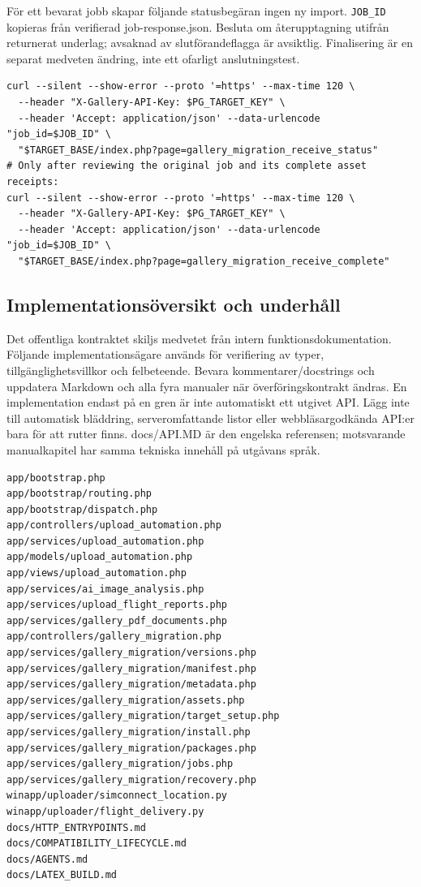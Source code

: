 \documentclass[11pt,a4paper]{article}
\newcommand{\codeword}[1]{\nolinkurl{#1}}
\begin{document}
För ett bevarat jobb skapar följande statusbegäran ingen ny import. \codeword{JOB_ID}
kopieras från verifierad job-response.json. Besluta om återupptagning utifrån returnerat
underlag; avsaknad av slutförandeflagga är avsiktlig. Finalisering är en separat medveten
ändring, inte ett ofarligt anslutningstest.

\begin{lstlisting}[language={}]
curl --silent --show-error --proto '=https' --max-time 120 \
  --header "X-Gallery-API-Key: $PG_TARGET_KEY" \
  --header 'Accept: application/json' --data-urlencode "job_id=$JOB_ID" \
  "$TARGET_BASE/index.php?page=gallery_migration_receive_status"
# Only after reviewing the original job and its complete asset receipts:
curl --silent --show-error --proto '=https' --max-time 120 \
  --header "X-Gallery-API-Key: $PG_TARGET_KEY" \
  --header 'Accept: application/json' --data-urlencode "job_id=$JOB_ID" \
  "$TARGET_BASE/index.php?page=gallery_migration_receive_complete"
\end{lstlisting}

\subsection{\texorpdfstring{Implementationsöversikt och underhåll}{Implementationsöversikt och underhåll}}

\label{api352:source-map}

Det offentliga kontraktet skiljs medvetet från intern funktionsdokumentation. Följande
implementationsägare används för verifiering av typer, tillgänglighetsvillkor och
felbeteende. Bevara kommentarer/docstrings och uppdatera Markdown och alla fyra manualer när
överföringskontrakt ändras. En implementation endast på en gren är inte automatiskt ett
utgivet API. Lägg inte till automatisk bläddring, serveromfattande listor eller
webbläsargodkända API:er bara för att rutter finns. docs/API.MD är den engelska referensen;
motsvarande manualkapitel har samma tekniska innehåll på utgåvans språk.

\begin{lstlisting}[language={}]
app/bootstrap.php
app/bootstrap/routing.php
app/bootstrap/dispatch.php
app/controllers/upload_automation.php
app/services/upload_automation.php
app/models/upload_automation.php
app/views/upload_automation.php
app/services/ai_image_analysis.php
app/services/upload_flight_reports.php
app/services/gallery_pdf_documents.php
app/controllers/gallery_migration.php
app/services/gallery_migration/versions.php
app/services/gallery_migration/manifest.php
app/services/gallery_migration/metadata.php
app/services/gallery_migration/assets.php
app/services/gallery_migration/target_setup.php
app/services/gallery_migration/install.php
app/services/gallery_migration/packages.php
app/services/gallery_migration/jobs.php
app/services/gallery_migration/recovery.php
winapp/uploader/simconnect_location.py
winapp/uploader/flight_delivery.py
docs/HTTP_ENTRYPOINTS.md
docs/COMPATIBILITY_LIFECYCLE.md
docs/AGENTS.md
docs/LATEX_BUILD.md
\end{lstlisting}
\end{document}
